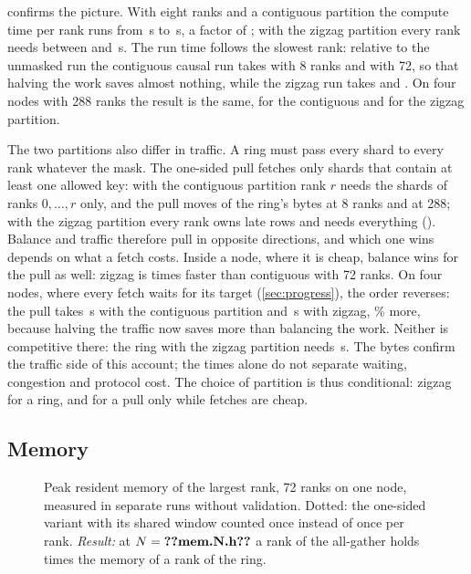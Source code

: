  confirms the picture. With eight ranks and a contiguous partition
the compute time per rank runs from \,s to
\,s, a factor of ;
with the zigzag partition every rank needs between  and
\,s. The run time follows the slowest rank: relative to the
unmasked run the contiguous causal run takes 
with 8 ranks and  with 72, so that halving
the work saves almost nothing, while the zigzag run takes
 and .
On four nodes with 288 ranks the result is the same, 
for the contiguous and  for the zigzag partition.

The two partitions also differ in traffic. A ring must pass every shard to every
rank whatever the mask. The one-sided pull fetches only shards that contain at
least one allowed key: with the contiguous partition rank $r$ needs the shards of
ranks $0,\dots,r$ only, and the pull moves  of the
ring's bytes at 8 ranks and  at 288; with the zigzag
partition every rank owns late rows and needs everything
(). Balance and traffic therefore pull in opposite
directions, and which one wins depends on what a fetch costs. Inside a node, where
it is cheap, balance wins for the pull as well: zigzag is
 times faster than contiguous with 72 ranks. On
four nodes, where every fetch waits for its target (\cref{sec:progress}), the
order reverses: the pull takes \,s with the
contiguous partition and \,s with zigzag,
\% more, because halving the traffic now saves
more than balancing the work. Neither is competitive there: the ring with the
zigzag partition needs \,s. The bytes confirm the
traffic side of this account; the times alone do not separate waiting, congestion
and protocol cost. The choice of partition is thus conditional: zigzag for a ring,
and for a pull only while fetches are cheap.

\subsection{Memory}
\begin{figure}[!htb]
\centering
{}
\caption{Peak resident memory of the largest rank, 72 ranks on one node, measured
in separate runs without validation. Dotted: the one-sided variant with its shared
window counted once instead of once per rank. \emph{Result:} at $N=\n{mem.N.h}$ a rank
of the all-gather holds  times the memory of a rank of the ring.}
\label{fig:memory}
\end{figure}

